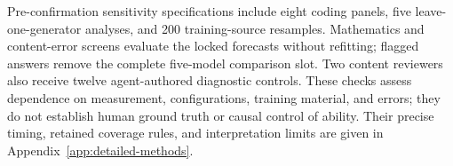 Pre-confirmation sensitivity specifications include eight coding panels, five
leave-one-generator analyses, and 200 training-source resamples. Mathematics
and content-error screens evaluate the locked forecasts without refitting;
flagged answers remove the complete five-model comparison slot. Two content
reviewers also receive twelve agent-authored diagnostic controls. These checks
assess dependence on measurement, configurations, training material, and errors;
they do not establish human ground truth or causal control of ability. Their
precise timing, retained coverage rules, and interpretation limits are given in
Appendix~\ref{app:detailed-methods}.
